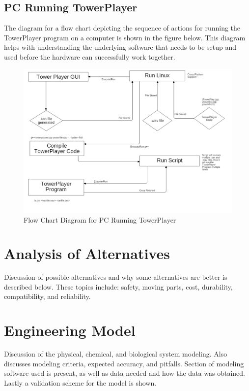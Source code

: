 \documentclass[12pt]{article}
\begin{document}
{{{	\subsection{PC Running TowerPlayer}
	The diagram for a flow chart depicting the sequence of actions for running the TowerPlayer program on a computer is shown in the figure below. This diagram helps with understanding the underlying software that needs to be setup and used before the hardware can successfully work together.
	
		\begin{figure}[ht!]
			\centering
			\includegraphics[width=170mm]{assets/PCRunningTowerPlayerFlowChartDiagram.png}
			\caption{Flow Chart Diagram for PC Running TowerPlayer \label{overflow}}
		\end{figure}

	\clearpage

\section{Analysis of Alternatives}
	Discussion of possible alternatives and why some alternatives are better is described below. These topics include: safety, moving parts, cost, durability, compatibility, and reliability.

	\newpage

\section{Engineering Model}
	Discussion of the physical, chemical, and biological system modeling. Also discusses modeling criteria, expected accuracy, and pitfalls. Section of modeling software used is present, as well as data needed and how the data was obtained. Lastly a validation scheme for the model is shown.

}}}
\end{document}
